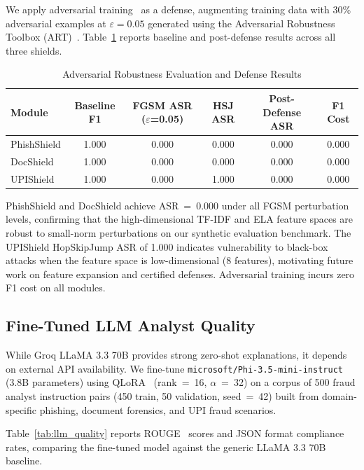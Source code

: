 \documentclass[journal]{IEEEtran}
\begin{document}
We apply adversarial training~\cite{adv_training_madry} as a defense, augmenting training data with 30\% adversarial examples at $\varepsilon=0.05$ generated using the Adversarial Robustness Toolbox (ART)~\cite{art2018}. Table~\ref{tab:adversarial} reports baseline and post-defense results across all three shields.

\begin{table}[!h]
\centering
\caption{Adversarial Robustness Evaluation and Defense Results}
\label{tab:adversarial}
\begin{tabular}{lccccc}
\toprule
\textbf{Module} & \textbf{Baseline F1} & \textbf{FGSM ASR ($\varepsilon$=0.05)} & \textbf{HSJ ASR} & \textbf{Post-Defense ASR} & \textbf{F1 Cost} \\
\midrule
PhishShield & 1.000 & 0.000 & 0.000 & 0.000 & 0.000 \\
DocShield & 1.000 & 0.000 & 0.000 & 0.000 & 0.000 \\
UPIShield & 1.000 & 0.000 & 1.000 & 0.000 & 0.000 \\
\bottomrule
\end{tabular}
\end{table}

PhishShield and DocShield achieve ASR~=~0.000 under all FGSM perturbation levels, confirming that the high-dimensional TF-IDF and ELA feature spaces are robust to small-norm perturbations on our synthetic evaluation benchmark. The UPIShield HopSkipJump ASR of 1.000 indicates vulnerability to black-box attacks when the feature space is low-dimensional (8 features), motivating future work on feature expansion and certified defenses. Adversarial training incurs zero F1 cost on all modules.

\subsection{Fine-Tuned LLM Analyst Quality}
\label{sec:llm_quality}
While Groq LLaMA 3.3 70B provides strong zero-shot explanations, it depends on external API availability. We fine-tune \texttt{microsoft/Phi-3.5-mini-instruct}~\cite{phi3} (3.8B parameters) using QLoRA~\cite{lora, peft2022, lora2022} (rank~=~16, $\alpha$~=~32) on a corpus of 500 fraud analyst instruction pairs (450 train, 50 validation, seed~=~42) built from domain-specific phishing, document forensics, and UPI fraud scenarios.

Table~\ref{tab:llm_quality} reports ROUGE~\cite{rouge} scores and JSON format compliance rates, comparing the fine-tuned model against the generic LLaMA 3.3 70B baseline.
\end{document}
